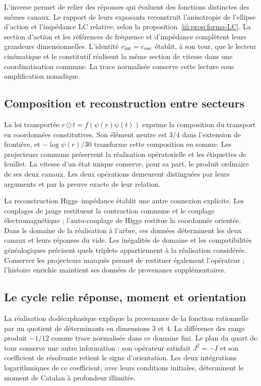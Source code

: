 L’inverse permet de relier des réponses qui évaluent des fonctions distinctes
des mêmes canaux. Le rapport de leurs exposants reconstruit
l’anisotropie de l’ellipse d’action et l’impédance LC relative,
selon la proposition~\ref{iii:prop:forma-LC}. La section d’action
et les références de fréquence et d’impédance complètent leurs grandeurs dimensionnelles.
L’identité $c_{\rm int}=c_{\rm vac}$ établit, à son tour, que le
lecteur cinématique et le constitutif réalisent la même section de
vitesse dans une coordinatisation commune. La trace normalisée conserve cette
lecture sous amplification nonadique.

\subsection*{Composition et reconstruction entre secteurs}

La loi transportée $r\odot t=f(\psi(r)\psi(t))$ exprime la composition
du transport en coordonnées constitutives. Son élément neutre est $3/4$ dans
l’extension de frontière, et $-\log\psi(r)/30$ transforme cette composition en
somme. Les projecteurs communs préservent la réalisation opératorielle et les
étiquettes de feuillet. La vitesse d’un état unique conserve, pour sa part,
le produit ordinaire de ses deux canaux. Les deux opérations demeurent
distinguées par leurs arguments et par la preuve exacte de leur relation.

La reconstruction Higgs--impédance établit une autre connexion explicite.
Les couplages de jauge restituent la contraction commune et le
couplage électromagnétique ; l’auto-couplage de Higgs restitue la
coordonnée orientée. Dans le domaine de la réalisation à l’arbre, ces
données déterminent les deux canaux et leurs réponses du vide. Les
inégalités de domaine et les compatibilités généalogiques précisent
quels triplets appartiennent à la réalisation considérée. Conserver les
projecteurs marqués permet de restituer également l’opérateur ; l’histoire
enrichie maintient ses données de provenance supplémentaires.

\subsection*{Le cycle relie réponse, moment et orientation}

La réalisation dodécaphasique explique la provenance de la fonction
rationnelle par un quotient de déterminants en dimensions $3$ et $4$.
La différence des rangs produit $-1/12$ comme trace normalisée dans ce
domaine fini. Le plan du quart de tour conserve une autre information :
son opérateur satisfait $J^2=-I$ et son coefficient de résolvante retient
le signe d’orientation. Les deux intégrations logarithmiques de ce
coefficient, avec leurs conditions initiales, déterminent le moment
de Catalan à profondeur illimitée.

